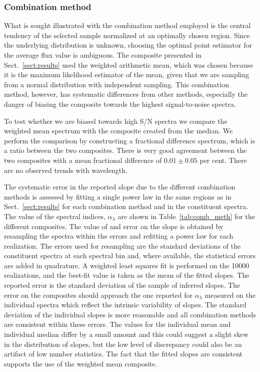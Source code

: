 \documentclass{aa}    %
\newcommand{\Tab}[1]{Table~\ref{tab:#1}}
\newcommand{\tab}[1]{\Tab{#1}}
\newcommand{\sectionname}{Sect.}
\newcommand{\Sect}[1]{\sectionname~\ref{sect:#1}}
\newcommand{\sect}[1]{\Sect{#1}}
\newcommand{\sectlabel}[1]{\label{sect:#1}}
\begin{document}
\subsubsection{Combination method}  \sectlabel{Combination method}
What is sought illustrated with the combination method employed is the central
tendency of the selected sample normalized at an optimally chosen region. Since
the underlying distribution is unknown, choosing the optimal point estimator for
the average flux value is ambiguous. The composite presented in \sect{results}
used the weighted arithmetic mean, which was chosen because it is the maximum
likelihood estimator of the mean, given that we are sampling from a normal
distribution with independent sampling. This combination method, however, has
systematic differences from other methods, especially the danger of biasing the
composite towards the highest signal-to-noise spectra. 

To test whether we are biased towards high S/N spectra we compare the
weighted mean spectrum with the composite created from the median. We
perform the comparison by constructing a fractional difference
spectrum, which is a ratio between the two composites. There is very
good agreement between the two composites with a mean fractional
difference of $0.01 \pm 0.05$ per cent. There are no observed trends with wavelength.

 The systematic error in the reported
slope due to the different combination methods is assessed by fitting
a single power law in the same regions as in \sect{results} for each
combination method and in the constituent spectra. The value of the
spectral indices, $\alpha_\lambda$ are shown in \tab{comb_meth} for the
different composites. The value of and error on the slope is obtained
by resampling the spectra within the errors and refitting a power law for
each realization. The errors used for resampling are the standard
deviations of the constituent spectra at each spectral bin and, where
available, the statistical errors are added in quadrature.
 A weighted least squares fit is performed on the 10000 realizations,
 and the best-fit value is taken as the mean of the fitted slopes. The
 reported error is the standard deviation of the sample of inferred slopes.
 The error on the composites should approach the one reported for
 $\alpha_\lambda$ measured on the individual spectra which reflect the
 intrinsic variability of slopes. The standard deviation of the
 individual slopes is more reasonable and all combination methods are
 consistent within these errors. The values for the individual mean
 and individual median differ by a small amount and this could suggest
 a slight skew in the distribution of slopes, but the low level of
 discrepancy could also be an artifact of low number statistics. The
 fact that the fitted slopes are consistent supports the use of the
 weighted mean composite.
\end{document}
